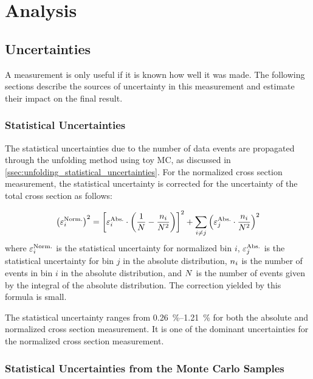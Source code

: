 \chapter{Analysis}
\label{chapter:analysis}

\section{Uncertainties}
\label{sec:uncertainties}

A measurement is only useful if it is known how well it was made. The following
sections describe the sources of uncertainty in this measurement and estimate
their impact on the final result.

\subsection{Statistical Uncertainties}
\label{ssec:stat_uncertainty}

The statistical uncertainties due to the number of data events are propagated
through the unfolding method using toy MC, as discussed in
\cref{ssec:unfolding_statistical_uncertainties}. For the normalized cross
section measurement, the statistical uncertainty is corrected for the
uncertainty of the total cross section as follows:

\begin{equation} \label{eq:stat}
    \left( \varepsilon^{\text{Norm.}}_{i} \right)^{2}
    =
    \left[
    \varepsilon^{\text{Abs.}}_{i} \cdot
        \left(
            \frac{1}{N} - \frac{n_{i}}{N^{2}}
        \right)
    \right]^{2}
    +
    \sum_{i \ne j}
    \left(
        \varepsilon^{\text{Abs.}}_{j} \cdot \frac{n_{i}}{N^{2}}
    \right)^{2}
\end{equation}
%
where $\varepsilon^{\text{Norm.}}_{i}$ is the statistical uncertainty for normalized bin $i$,
$\varepsilon^{\text{Abs.}}_{j}$ is the statistical uncertainty for bin $j$ in the absolute
distribution, $n_{i}$ is the number of events in bin $i$ in the absolute
distribution, and $N$ is the number of events given by the integral of
the absolute distribution. The correction yielded by this formula is small.

The statistical uncertainty ranges from \SIrange{0.26}{1.21}{\percent} for both
the absolute and normalized cross section measurement. It is one of the
dominant uncertainties for the normalized cross section measurement.

\subsection{Statistical Uncertainties from the Monte Carlo Samples}
\label{ssec:mc_stat_uncertainty}

